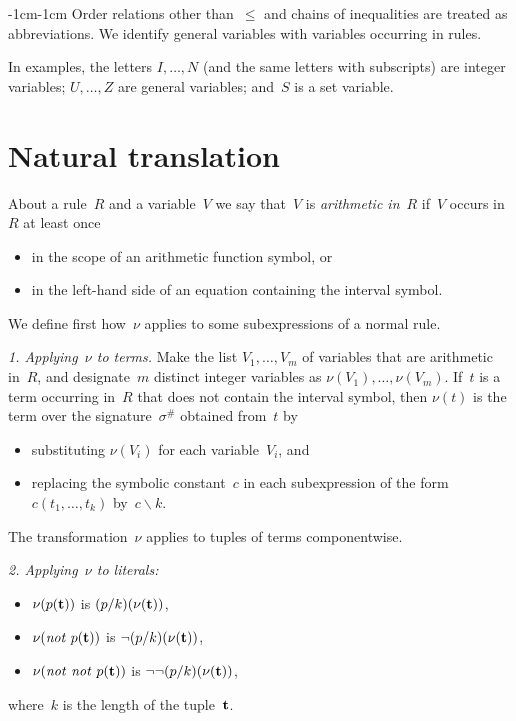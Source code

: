 \documentclass[11pt]{article}
\def\bs{\backslash}
\newcommand{\no}{\ensuremath{\mathit{not}}}
\begin{document}
\begin{adjustwidth}{-1cm}{-1cm}
Order relations other than~$\leq$ and chains
of inequalities are treated as abbreviations. We identify general variables
with variables occurring in rules.

In examples, the letters $I,\dots,N$ (and the same letters with subscripts)
are integer variables; $U,\dots,Z$ are general variables; and~$S$ is a set
variable.

\section{Natural translation}

About a rule~$R$ and a variable~$V$ we say that~$V$ is \emph{arithmetic
  in}~$R$ if~$V$ occurs in~$R$ at least once
\begin{itemize}
\item
  in the scope of an arithmetic function symbol, or
\item
  in the left-hand side of an equation containing the interval symbol.
\end{itemize}

We define first how~$\nu$ applies to some subexpressions of a normal rule.

\medskip\noindent \emph{1. Applying~$\nu$ to terms.}
Make the list $V_1,\dots,V_m$ of variables that are arithmetic in~$R$,
and designate~$m$ distinct integer variables as $\nu(V_1),\dots,\nu(V_m)$.
If~$t$ is a term occurring in~$R$ that does not contain the interval symbol,
then $\nu(t)$ is the term over
the signature~$\sigma^\#$ obtained from~$t$ by
\begin{itemize}
\item substituting $\nu(V_i)$ for each variable~$V_i$, and
\item replacing the symbolic constant~$c$ in each subexpression of the
  form $c(t_1,\dots,t_k)$ by~$c\bs k$.
\end{itemize}

\medskip
The transformation~$\nu$ applies to tuples of terms componentwise.

\medskip\noindent \emph{2. Applying~$\nu$ to literals:}
\begin{itemize}
\item
$\nu(p({\bf t}))$ is $(p/k)(\nu({\bf t}))$,
\item $\nu(\no\ p({\bf t}))$ is $\neg (p/k)(\nu({\bf t}))$,
\item $\nu(\no\ \no\ p({\bf t}))$ is $\neg\neg (p/k)(\nu({\bf t}))$,
\end{itemize}
where~$k$ is the length of the tuple~$\bf t$.


\end{adjustwidth}
\end{document}
